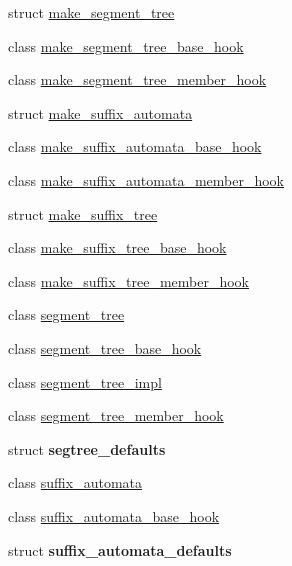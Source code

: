 \begin{DoxyCompactItemize}
\item 
struct \hyperlink{structboost_1_1intrusive_1_1make__segment__tree}{make\+\_\+segment\+\_\+tree}
\item 
class \hyperlink{classboost_1_1intrusive_1_1make__segment__tree__base__hook}{make\+\_\+segment\+\_\+tree\+\_\+base\+\_\+hook}
\item 
class \hyperlink{classboost_1_1intrusive_1_1make__segment__tree__member__hook}{make\+\_\+segment\+\_\+tree\+\_\+member\+\_\+hook}
\item 
struct \hyperlink{structboost_1_1intrusive_1_1make__suffix__automata}{make\+\_\+suffix\+\_\+automata}
\item 
class \hyperlink{classboost_1_1intrusive_1_1make__suffix__automata__base__hook}{make\+\_\+suffix\+\_\+automata\+\_\+base\+\_\+hook}
\item 
class \hyperlink{classboost_1_1intrusive_1_1make__suffix__automata__member__hook}{make\+\_\+suffix\+\_\+automata\+\_\+member\+\_\+hook}
\item 
struct \hyperlink{structboost_1_1intrusive_1_1make__suffix__tree}{make\+\_\+suffix\+\_\+tree}
\item 
class \hyperlink{classboost_1_1intrusive_1_1make__suffix__tree__base__hook}{make\+\_\+suffix\+\_\+tree\+\_\+base\+\_\+hook}
\item 
class \hyperlink{classboost_1_1intrusive_1_1make__suffix__tree__member__hook}{make\+\_\+suffix\+\_\+tree\+\_\+member\+\_\+hook}
\item 
class \hyperlink{classboost_1_1intrusive_1_1segment__tree}{segment\+\_\+tree}
\item 
class \hyperlink{classboost_1_1intrusive_1_1segment__tree__base__hook}{segment\+\_\+tree\+\_\+base\+\_\+hook}
\item 
class \hyperlink{classboost_1_1intrusive_1_1segment__tree__impl}{segment\+\_\+tree\+\_\+impl}
\item 
class \hyperlink{classboost_1_1intrusive_1_1segment__tree__member__hook}{segment\+\_\+tree\+\_\+member\+\_\+hook}
\item 
struct {\bfseries segtree\+\_\+defaults}
\item 
class \hyperlink{classboost_1_1intrusive_1_1suffix__automata}{suffix\+\_\+automata}
\item 
class \hyperlink{classboost_1_1intrusive_1_1suffix__automata__base__hook}{suffix\+\_\+automata\+\_\+base\+\_\+hook}
\item 
struct {\bfseries suffix\+\_\+automata\+\_\+defaults}
\item 

\end{DoxyCompactItemize}
